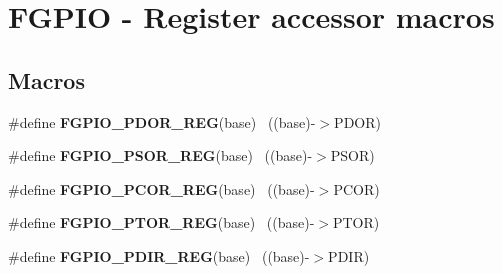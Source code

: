 \hypertarget{group___f_g_p_i_o___register___accessor___macros}{}\section{F\+G\+P\+I\+O -\/ Register accessor macros}
\label{group___f_g_p_i_o___register___accessor___macros}
\subsection*{Macros}
\begin{DoxyCompactItemize}
\item 
\hypertarget{group___f_g_p_i_o___register___accessor___macros_ga15263a8d3411201623c2541b15a160c9}{}\#define {\bfseries F\+G\+P\+I\+O\+\_\+\+P\+D\+O\+R\+\_\+\+R\+E\+G}(base)                                      ~((base)-\/$>$P\+D\+O\+R)\label{group___f_g_p_i_o___register___accessor___macros_ga15263a8d3411201623c2541b15a160c9}

\item 
\hypertarget{group___f_g_p_i_o___register___accessor___macros_ga0fd5e604dcdaba6e42f0d06f9e4410bb}{}\#define {\bfseries F\+G\+P\+I\+O\+\_\+\+P\+S\+O\+R\+\_\+\+R\+E\+G}(base)                                      ~((base)-\/$>$P\+S\+O\+R)\label{group___f_g_p_i_o___register___accessor___macros_ga0fd5e604dcdaba6e42f0d06f9e4410bb}

\item 
\hypertarget{group___f_g_p_i_o___register___accessor___macros_gab5033219fb0e50c7dd60b3fbf1cc2dde}{}\#define {\bfseries F\+G\+P\+I\+O\+\_\+\+P\+C\+O\+R\+\_\+\+R\+E\+G}(base)                                      ~((base)-\/$>$P\+C\+O\+R)\label{group___f_g_p_i_o___register___accessor___macros_gab5033219fb0e50c7dd60b3fbf1cc2dde}

\item 
\hypertarget{group___f_g_p_i_o___register___accessor___macros_gabbed07bd5d1202717414b3682c03039c}{}\#define {\bfseries F\+G\+P\+I\+O\+\_\+\+P\+T\+O\+R\+\_\+\+R\+E\+G}(base)                                      ~((base)-\/$>$P\+T\+O\+R)\label{group___f_g_p_i_o___register___accessor___macros_gabbed07bd5d1202717414b3682c03039c}

\item 
\hypertarget{group___f_g_p_i_o___register___accessor___macros_gacc856fb3636de989a65e71d60efb8ef8}{}\#define {\bfseries F\+G\+P\+I\+O\+\_\+\+P\+D\+I\+R\+\_\+\+R\+E\+G}(base)                                      ~((base)-\/$>$P\+D\+I\+R)\label{group___f_g_p_i_o___register___accessor___macros_gacc856fb3636de989a65e71d60efb8ef8}


\end{DoxyCompactItemize}
